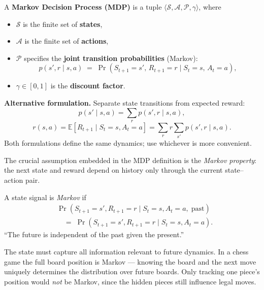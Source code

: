 \documentclass[11pt, oneside]{book}
\newcommand{\E}{\mathbb{E}}              %
\newcommand{\Sset}{\mathcal{S}}          %
\newcommand{\Aset}{\mathcal{A}}          %
\begin{document}
\begin{defbox}[title={Markov Decision Process}]
A \textbf{Markov Decision Process (MDP)} is a tuple
$\langle \Sset, \Aset, \mathcal{P}, \gamma \rangle$, where
\begin{itemize}
  \item $\Sset$ is the finite set of \textbf{states},
  \item $\Aset$ is the finite set of \textbf{actions},
  \item $\mathcal{P}$ specifies the \textbf{joint transition probabilities} (Markov):
  \[
    p(s', r \mid s, a) \;=\; \Pr(S_{t+1}=s',\, R_{t+1}=r \mid S_t=s,\, A_t=a),
  \]
  \item $\gamma \in [0,1]$ is the \textbf{discount factor}.
\end{itemize}

\medskip
\textbf{Alternative formulation.}
Separate state transitions from expected reward:
\[
  p(s' \mid s, a) = \sum_r p(s', r \mid s, a),
\]
\[
  r(s, a) = \E[R_{t+1} \mid S_t=s, A_t=a] = \sum_r r \sum_{s'} p(s',r \mid s,a).
\]
Both formulations define the same dynamics; use whichever is more convenient.
\end{defbox}

The crucial assumption embedded in the MDP definition is the \emph{Markov property}:
the next state and reward depend on history only through the current state--action pair.

\begin{defbox}[title={Markov Property}]
A state signal is \emph{Markov} if
\begin{align*}
  &\Pr(S_{t+1}=s', R_{t+1}=r \mid S_t=s, A_t=a,\;\text{past}) \\
  &\quad=\; \Pr(S_{t+1}=s', R_{t+1}=r \mid S_t=s, A_t=a).
\end{align*}
``The future is independent of the past given the present.''
\end{defbox}

The state must capture all information relevant to future dynamics.
In a chess game the full board position is Markov --- knowing the board and the next
move uniquely determines the distribution over future boards.
Only tracking one piece's position would \emph{not} be Markov, since the hidden
pieces still influence legal moves.
\end{document}
